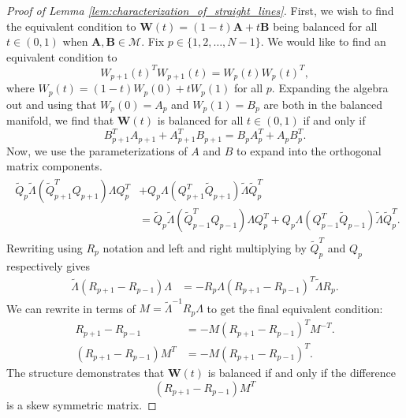 \documentclass{amsart}
\theoremstyle{definition}
\theoremstyle{remark}
\numberwithin{equation}{section}
\begin{document}
\begin{proof}[Proof of Lemma \ref{lem:characterization_of_straight_lines}]
    First, we wish to find the equivalent condition to $\mathbf{W}(t) = (1-t)\mathbf{A} + t\mathbf{B}$ being balanced for all $t \in (0,1)$ when $\mathbf{A}, \mathbf{B} \in \mathcal{M}$. Fix $p \in \{1, 2, \ldots, N-1\}$. We would like to find an equivalent condition to
    \begin{equation}
        W_{p+1}(t)^TW_{p+1}(t) = W_p(t)W_p(t)^T,
    \end{equation}
    where $W_p(t) = (1-t)W_p(0) + tW_p(1)$ for all $p$. Expanding the algebra out and using that $W_p(0) = A_p$ and $W_p(1) = B_p$ are both in the balanced manifold, we find that $\mathbf{W}(t)$ is balanced for all $t \in (0,1)$ if and only if
    \begin{equation}
        B_{p+1}^TA_{p+1} + A_{p+1}^TB_{p+1} = B_{p}A_{p}^T + A_{p}B_{p}^T.
    \end{equation}
    Now, we use the parameterizations of $A$ and $B$ to expand into the orthogonal matrix components.
    \begin{align}
    \begin{split}
        \tilde{Q}_{p}\tilde{\Lambda}(\tilde{Q}_{p+1}^T Q_{p+1})\Lambda Q_{p}^T &+ Q_{p}\Lambda (Q_{p+1}^T\tilde{Q}_{p+1})\tilde{\Lambda}\tilde{Q}_{p}^T \\
        &= 
        \tilde{Q}_{p}\tilde{\Lambda}(\tilde{Q}_{p-1}^T Q_{p-1})\Lambda Q_{p}^T + Q_{p}\Lambda (Q_{p-1}^T\tilde{Q}_{p-1})\tilde{\Lambda}\tilde{Q}_{p}^T.
    \end{split}
    \end{align}
    Rewriting using $R_p$ notation and left and right multiplying by $\tilde{Q}_p^T$ and $Q_p$ respectively gives 
    \begin{align}
        \tilde{\Lambda}(
R_{p+1} - R_{p-1})\Lambda  &= - R_p \Lambda (R_{p+1} - R_{p-1})^T \tilde{\Lambda} R_p.
    \end{align}
    We can rewrite in terms of $M = \tilde{\Lambda}^{-1} R_p \Lambda$ to get the final equivalent condition:
    \begin{align}
        R_{p+1} - R_{p-1} &= -M(R_{p+1} - R_{p-1})^TM^{-T}.\\
        (R_{p+1} - R_{p-1})M^T &= -M(R_{p+1} - R_{p-1})^T.
    \end{align}
    The structure demonstrates that $\mathbf{W}(t)$ is balanced if and only if the difference 
    \begin{equation}
        (R_{p+1} - R_{p-1})M^T
    \end{equation}
    is a skew symmetric matrix.


\end{proof}
\end{document}
